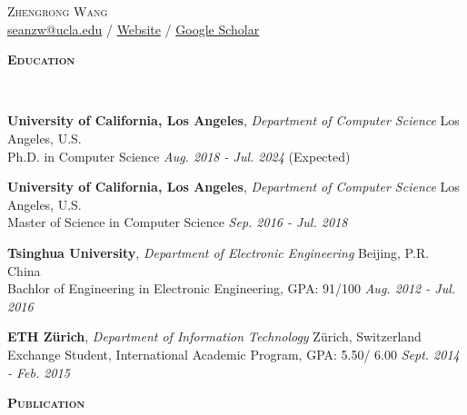 \documentclass[a4paper]{article}
\newenvironment{changemargin}[2]{%
  \begin{list}{}{%
    \setlength{\topsep}{0pt}%
    \setlength{\leftmargin}{#1}%
    \setlength{\rightmargin}{#2}%
    \setlength{\listparindent}{\parindent}%
    \setlength{\itemindent}{\parindent}%
    \setlength{\parsep}{\parskip}%
  }%
  \item[]}{\end{list}
}
\newcommand{\lineover}{
	\begin{changemargin}{-0.05in}{-0.05in}
		\vspace*{-8pt}
		\hrulefill \\
		\vspace*{-2pt}
	\end{changemargin}
}
\newcommand{\header}[1]{
	\begin{changemargin}{-0.5in}{-0.5in}
		\scshape{\textbf{#1}}\\
  	\lineover
	\end{changemargin}
}
\newcommand{\contact}[4]{
	\begin{changemargin}{-0.5in}{-0.5in}
		\begin{center}
			{\Large \scshape {#1}}\\ \smallskip
			{\href{#2}{#2}} / \smallskip 
			{\href{#3}{Website}} /
			{\href{#4}{Google Scholar}}\smallskip
		\end{center}
	\end{changemargin}
}
\newenvironment{body} {
	\vspace*{-16pt}
	\begin{changemargin}{-0.5in}{-0.5in}
  }	
	{\end{changemargin}
}
\begin{document}
\contact{Zhengrong Wang}{seanzw@ucla.edu}{https://seanzw.github.io}{https://scholar.google.com/citations?user=h\_GwGfQAAAAJ\&hl=en}


\header{Education}

\begin{body}
	\vspace{14pt}

	\textbf{University of California, Los Angeles}, \emph{Department of Computer Science} \hfill Los Angeles, U.S. \\
Ph.D. in Computer Science \hfill \emph{Aug. 2018 - Jul. 2024} (Expected){} \\

\vspace{6pt}

	\textbf{University of California, Los Angeles}, \emph{Department of Computer Science} \hfill Los Angeles, U.S. \\
Master of Science in Computer Science \hfill \emph{Sep. 2016 - Jul. 2018}{} \\

\vspace{6pt}

	\textbf{Tsinghua University}, \emph{Department of Electronic Engineering} \hfill Beijing, P.R. China \\
Bachlor of Engineering in Electronic Engineering, GPA: 91/100 \hfill \emph{Aug. 2012 - Jul. 2016}{} \\
\vspace{6pt}

	\textbf{ETH Z\"urich}, \emph{Department of Information Technology} \hfill Z\"urich, Switzerland \\
	Exchange Student, International Academic Program, GPA: 5.50/ 6.00 \hfill \emph{Sept. 2014 - Feb. 2015}{} \\


\end{body}

\smallskip
\smallskip

\header{Publication}
\end{document}
